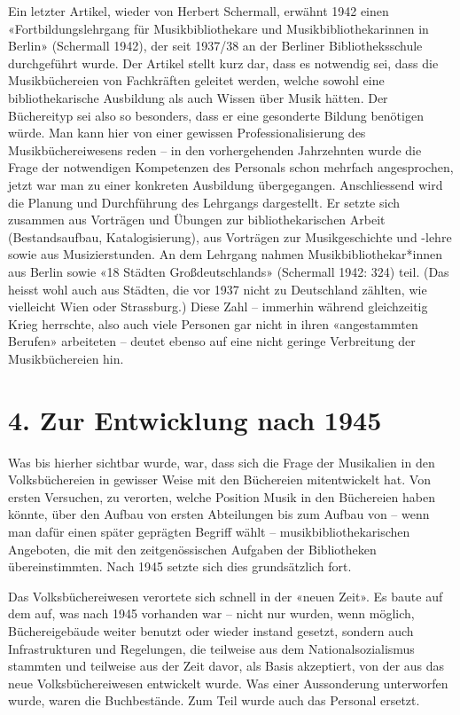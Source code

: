 \documentclass[a4paper,
fontsize=11pt,
oneside,
numbers=noperiodatend,
parskip=half-,
bibliography=totoc,
final
]{scrartcl}
\begin{document}
Ein letzter Artikel, wieder von Herbert Schermall, erwähnt 1942 einen
«Fortbildungslehrgang für Musikbibliothekare und Musikbibliothekarinnen
in Berlin» (Schermall 1942), der seit 1937/38 an der Berliner
Bibliotheksschule durchgeführt wurde. Der Artikel stellt kurz dar, dass
es notwendig sei, dass die Musikbüchereien von Fachkräften geleitet
werden, welche sowohl eine bibliothekarische Ausbildung als auch Wissen
über Musik hätten. Der Büchereityp sei also so besonders, dass er eine
gesonderte Bildung benötigen würde. Man kann hier von einer gewissen
Professionalisierung des Musikbüchereiwesens reden -- in den
vorhergehenden Jahrzehnten wurde die Frage der notwendigen Kompetenzen
des Personals schon mehrfach angesprochen, jetzt war man zu einer
konkreten Ausbildung übergegangen. Anschliessend wird die Planung und
Durchführung des Lehrgangs dargestellt. Er setzte sich zusammen aus
Vorträgen und Übungen zur bibliothekarischen Arbeit (Bestandsaufbau,
Katalogisierung), aus Vorträgen zur Musikgeschichte und -lehre sowie aus
Musizierstunden. An dem Lehrgang nahmen Musikbibliothekar*innen aus
Berlin sowie «18 Städten Großdeutschlands» (Schermall 1942: 324) teil.
(Das heisst wohl auch aus Städten, die vor 1937 nicht zu Deutschland
zählten, wie vielleicht Wien oder Strassburg.) Diese Zahl -- immerhin
während gleichzeitig Krieg herrschte, also auch viele Personen gar nicht
in ihren «angestammten Berufen» arbeiteten -- deutet ebenso auf eine
nicht geringe Verbreitung der Musikbüchereien hin.

\hypertarget{zur-entwicklung-nach-1945}{%
\section{4. Zur Entwicklung nach
1945}\label{zur-entwicklung-nach-1945}}

Was bis hierher sichtbar wurde, war, dass sich die Frage der Musikalien
in den Volksbüchereien in gewisser Weise mit den Büchereien
mitentwickelt hat. Von ersten Versuchen, zu verorten, welche Position
Musik in den Büchereien haben könnte, über den Aufbau von ersten
Abteilungen bis zum Aufbau von -- wenn man dafür einen später geprägten
Begriff wählt -- musikbibliothekarischen Angeboten, die mit den
zeitgenössischen Aufgaben der Bibliotheken übereinstimmten. Nach 1945
setzte sich dies grundsätzlich fort.

Das Volksbüchereiwesen verortete sich schnell in der «neuen Zeit». Es
baute auf dem auf, was nach 1945 vorhanden war -- nicht nur wurden, wenn
möglich, Büchereigebäude weiter benutzt oder wieder instand gesetzt,
sondern auch Infrastrukturen und Regelungen, die teilweise aus dem
Nationalsozialismus stammten und teilweise aus der Zeit davor, als Basis
akzeptiert, von der aus das neue Volksbüchereiwesen entwickelt wurde.
Was einer Aussonderung unterworfen wurde, waren die Buchbestände. Zum
Teil wurde auch das Personal ersetzt.
\end{document}
